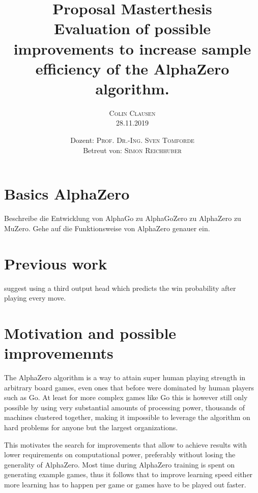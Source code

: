 \documentclass[12pt,onecolumn,oneside,titlepage]{article}
\begin{document}
\title{\bfseries {\Large Proposal Masterthesis}\\[2cm]
      Evaluation of possible improvements to increase sample efficiency of the AlphaZero algorithm.}

\author{\textsc{Colin Clausen}\\[1cm]
        28.11.2019\\[3cm]}

\date{Dozent: \textsc{Prof. Dr.-Ing. Sven Tomforde}\\
      Betreut von: \textsc{Simon Reichhuber}}


\maketitle
\setcounter{tocdepth}{2}  %
\tableofcontents
\newpage

\section{Basics AlphaZero}

Beschreibe die Entwicklung von AlphaGo zu AlphaGoZero zu AlphaZero zu MuZero. Gehe auf die Funktionsweise von AlphaZero genauer ein.

\section{Previous work}


\cite{anonymous2020threehead} suggest using a third output head which predicts the win probability after playing every move.


\section{Motivation and possible improvemennts}

The AlphaZero algorithm is a way to attain super human playing strength in arbitrary board games, even ones that before were dominated by human players such as Go.
At least for more complex games like Go this is however still only possible by using very substantial amounts of processing power, thousands of machines clustered together,
making it impossible to leverage the algorithm on hard problems for anyone but the largest organizations.

This motivates the search for improvements that allow to achieve results with lower requirements on computational power, preferably without losing the generality of AlphaZero.
Most time during AlphaZero training is spent on generating example games,
thus it follows that to improve learning speed either more learning has to happen per game or games have to be played out faster.
\end{document}
